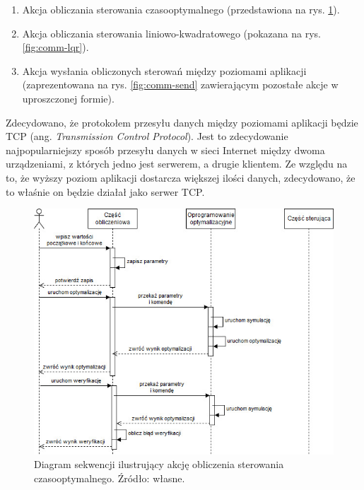 \begin{enumerate}
    \item Akcja obliczania sterowania czasooptymalnego (przedstawiona na rys. \ref{fig:comm-toc}).
    \item Akcja obliczania sterowania liniowo-kwadratowego (pokazana na rys. \ref{fig:comm-lqr}).
    \item Akcja wysłania obliczonych sterowań między poziomami aplikacji (zaprezentowana na rys. \ref{fig:comm-send} zawierającym pozostałe akcje w uproszczonej formie).
\end{enumerate}

Zdecydowano, że protokołem przesyłu danych między poziomami aplikacji będzie TCP (ang. \emph{Transmission Control Protocol}). Jest to zdecydowanie najpopularniejszy sposób przesyłu danych w sieci Internet między dwoma urządzeniami, z których jedno jest serwerem, a drugie klientem. Ze względu na to, że wyższy poziom aplikacji dostarcza większej ilości danych, zdecydowano, że to właśnie on będzie działał jako serwer TCP.

\begin{figure}[hpt]
    \centering
    \includegraphics[width=\textwidth]{Grafika/communication-toc}
    \caption{Diagram sekwencji ilustrujący akcję obliczenia sterowania czasooptymalnego. Źródło: własne.}\label{fig:comm-toc}
\end{figure}

